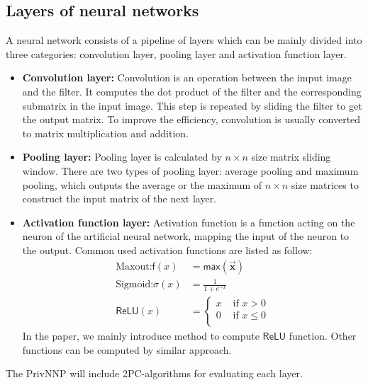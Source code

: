 \documentclass[letterpaper]{article} %
\begin{document}
    \subsection{Layers of neural networks}
    A neural network consists of a pipeline of layers which can be mainly divided into three categories:
    convolution layer, pooling layer and activation function layer.
    \begin{itemize}
        \item \textbf{Convolution layer:}
        Convolution is an operation between the imput image and the filter.
        It computes the dot product of the filter and the corresponding submatrix in the input image.
        This step is repeated by sliding the filter to get the output matrix.
        To improve the efficiency, convolution is usually converted to matrix multiplication and addition.

        \item \textbf{Pooling layer:}
        Pooling layer is calculated by $n\times n$ size matrix sliding window.
        There are two types of pooling layer: average pooling and maximum pooling,
        which outputs the average or the maximum of $n\times n$ size matrices to construct the input matrix of the next layer.

        \item \textbf{Activation function layer:}
        Activation function is a function acting on the neuron of the artificial neural network,
        mapping the input of the neuron to the output.
        Common used activation functions are listed as follow:
        \begin{align*}
        \text{Maxout:} \mathsf{f}(x) &= \mathsf{max}( \overrightarrow{\mathbf{x}})\\
        \text{Sigmoid:} \sigma(x) &=\frac{1}{1+e^{-x}}\\
        \mathsf{ReLU}(x)&=\begin{cases}
            x & \text{ if } x > 0 \\
            0 & \text{ if } x \leqslant 0 \\
            \end{cases}
        \end{align*}
        In the paper, we mainly introduce method to compute $\mathsf{ReLU}$ function.
        Other functions can be computed by similar approach.
    \end{itemize}
    The PrivNNP will include 2PC-algorithms for evaluating each layer.
\end{document}
